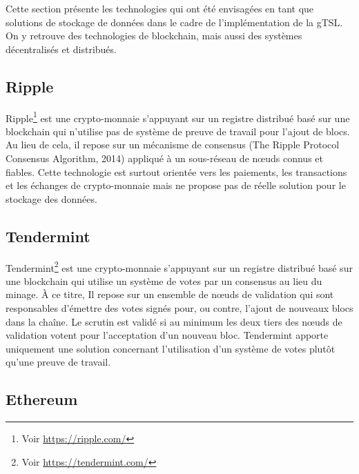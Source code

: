 \documentclass{tnreport}
\begin{document}
Cette section présente les technologies qui ont été envisagées en tant que solutions de stockage de données dans le cadre de l'implémentation de la gTSL. On y retrouve des technologies de blockchain, mais aussi des systèmes décentralisés et distribués.

\subsection{Ripple}

Ripple\footnote{Voir \url{https://ripple.com/}} est une crypto-monnaie s'appuyant sur un registre distribué basé sur une blockchain qui n'utilise pas de système de preuve de travail pour l'ajout de blocs. Au lieu de cela, il repose sur un mécanisme de consensus (The Ripple Protocol Consensus Algorithm, 2014) appliqué à un sous-réseau de nœuds connus et fiables. Cette technologie est surtout orientée vers les paiements, les transactions et les échanges de crypto-monnaie mais ne propose pas de réelle solution pour le stockage des données.

\subsection{Tendermint}

Tendermint\footnote{Voir \url{https://tendermint.com/}} est une crypto-monnaie s'appuyant sur un registre distribué basé sur une blockchain qui utilise un système de votes par un consensus au lieu du minage. À ce titre, Il repose sur un ensemble de nœuds de validation qui sont responsables d'émettre des votes signés pour, ou contre, l'ajout de nouveaux blocs dans la chaîne. Le scrutin est validé si au minimum les deux tiers des nœuds de validation votent pour l'acceptation d'un nouveau bloc. Tendermint apporte uniquement une solution concernant l'utilisation d'un système de votes plutôt qu'une preuve de travail.

\subsection{Ethereum}
\end{document}
